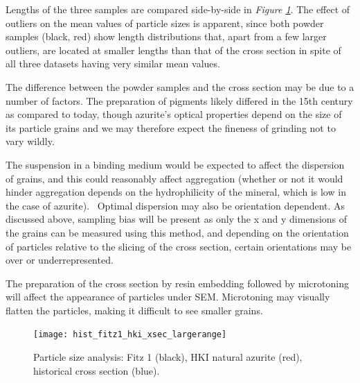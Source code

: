 Lengths of the three samples are compared side-by-side in \textit{Figure \ref{fig:hist_all}}. The effect of outliers on the mean values of particle sizes is apparent, since both powder samples (black, red) show length distributions that, apart from a few larger outliers, are located at smaller lengths than that of the cross section in spite of all three datasets having very similar mean values. 

The difference between the powder samples and the cross section may be due to a number of factors. The preparation of pigments likely differed in the 15th century as compared to today, though azurite's optical properties depend on the size of its particle grains and we may therefore expect the fineness of grinding not to vary wildly. 

The suspension in a binding medium would be expected to affect the dispersion of grains, and this could reasonably affect aggregation (whether or not it would hinder aggregation depends on the hydrophilicity of the mineral, which is low in the case of azurite).~\autocite{zhang} Optimal dispersion may also be orientation dependent. As discussed above, sampling bias will be present as only the x and y dimensions of the grains can be measured using this method, and depending on the orientation of particles relative to the slicing of the cross section, certain orientations may be over or underrepresented. 

The preparation of the cross section by resin embedding followed by microtoning will affect the appearance of particles under SEM. Microtoning may visually flatten the particles, making it difficult to see smaller grains. 

\begin{figure}[H]
\centering
  \texttt{[image: hist\_fitz1\_hki\_xsec\_largerange]}
\caption[Particle size analysis: HKI natural azurite, Fitz 1, historical cross section]{Particle size analysis: Fitz 1 (black), HKI natural azurite (red), historical cross section (blue).} 
\label{fig:hist_all}
\end{figure}




